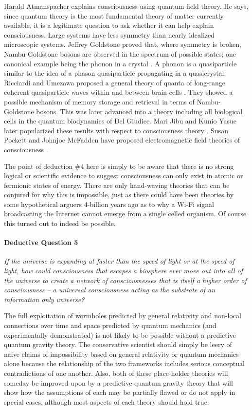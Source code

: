 \documentclass[submission,copyright,creativecommons]{eptcs}
\begin{document}
Harald Atmanspacher explains consciousness using quantum field theory\cite{atmanspacher2004quantum}. He says, since quantum theory is the most fundamental theory of matter currently available, it is a legitimate question to ask whether it can help explain consciousness. Large systems have less symmetry than nearly idealized microscopic systems. Jeffrey Goldstone proved that, where symmetry is broken, Nambu-Goldstone bosons are observed in the spectrum of possible states; one canonical example being the phonon in a crystal \cite{goldstone1962broken}. A phonon is a quasiparticle similar to the idea of a phason quasiparticle propagating in a quasicrystal. Ricciardi and Umezawa proposed a general theory of quanta of long-range coherent quasiparticle waves within and between brain cells \cite{ricciardi1967brain}. They showed a possible mechanism of memory storage and retrieval in terms of Nambu-Goldstone bosons. This was later advanced into a theory including all biological cells in the quantum biodynamics of Del Giudice. Mari Jibu and Kunio Yasue later popularized these results with respect to consciousness theory \cite{jibu1995quantum}. Susan Pockett and Johnjoe McFadden have proposed electromagnetic field theories of consciousness \cite{mcfadden2002conscious}.

The point of deduction \#4 here is simply to be aware that there is no strong logical or scientific evidence to suggest consciousness can only exist in atomic or fermionic states of energy. There are only hand-waving theories that can be conjured for why this is impossible, just as there could have been theories by some hypothetical arguers 4-billion years ago as to why a Wi-Fi signal broadcasting the Internet cannot emerge from a single celled organism. Of course this turned out to indeed be possible.


\paragraph{\textbf{Deductive Question 5}}

\textit{If the universe is expanding at faster than the speed of light or at the speed of light, how could consciousness that escapes a biosphere ever move out into all of the universe to create a network of consciousnesses that is itself a higher order of consciousness -- a universal consciousness acting as the substrate of an information only universe?}\hfill\break

The full exploitation of wormholes predicted by general relativity and non-local connections over time and space predicted by quantum mechanics (and experimentally demonstrated) is not likely to be possible without a predictive quantum gravity theory. The conservative scientist should simply be leery of naive claims of impossibility based on general relativity or quantum mechanics alone because the relationship of the two frameworks includes serious conceptual contradictions of one another. Also, both of these place-holder theories will someday be improved upon by a predictive quantum gravity theory that will show how the assumptions of each may be partially flawed or do not apply in special cases, although most aspects of each theory should hold true.
\end{document}

